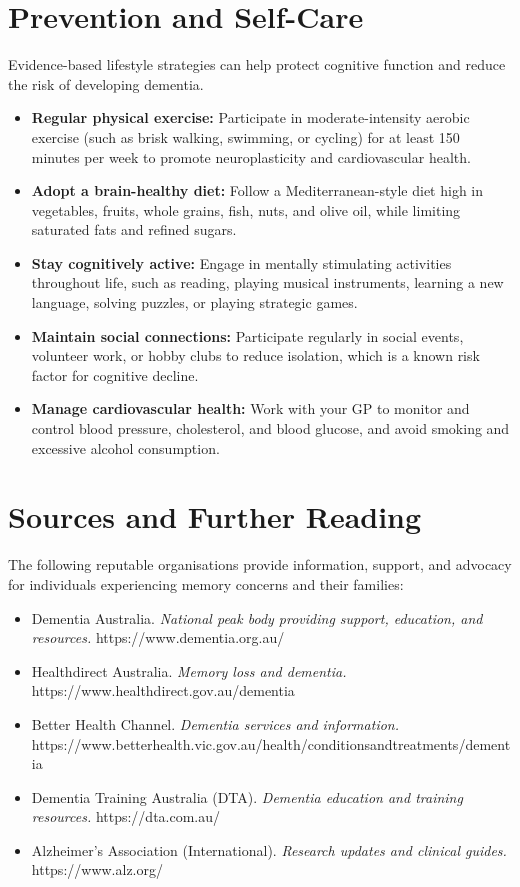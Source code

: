 \section*{Prevention and Self-Care}
Evidence-based lifestyle strategies can help protect cognitive function and reduce the risk of developing dementia.
\begin{itemize}
    \item \textbf{Regular physical exercise:} Participate in moderate-intensity aerobic exercise (such as brisk walking, swimming, or cycling) for at least 150 minutes per week to promote neuroplasticity and cardiovascular health.
    \item \textbf{Adopt a brain-healthy diet:} Follow a Mediterranean-style diet high in vegetables, fruits, whole grains, fish, nuts, and olive oil, while limiting saturated fats and refined sugars.
    \item \textbf{Stay cognitively active:} Engage in mentally stimulating activities throughout life, such as reading, playing musical instruments, learning a new language, solving puzzles, or playing strategic games.
    \item \textbf{Maintain social connections:} Participate regularly in social events, volunteer work, or hobby clubs to reduce isolation, which is a known risk factor for cognitive decline.
    \item \textbf{Manage cardiovascular health:} Work with your GP to monitor and control blood pressure, cholesterol, and blood glucose, and avoid smoking and excessive alcohol consumption.
\end{itemize}

\section*{Sources and Further Reading}
The following reputable organisations provide information, support, and advocacy for individuals experiencing memory concerns and their families:
\begin{itemize}
    \item Dementia Australia. \textit{National peak body providing support, education, and resources.} https://www.dementia.org.au/
    \item Healthdirect Australia. \textit{Memory loss and dementia.} https://www.healthdirect.gov.au/dementia
    \item Better Health Channel. \textit{Dementia services and information.} https://www.betterhealth.vic.gov.au/health/conditionsandtreatments/dementia
    \item Dementia Training Australia (DTA). \textit{Dementia education and training resources.} https://dta.com.au/
    \item Alzheimer's Association (International). \textit{Research updates and clinical guides.} https://www.alz.org/
\end{itemize}
